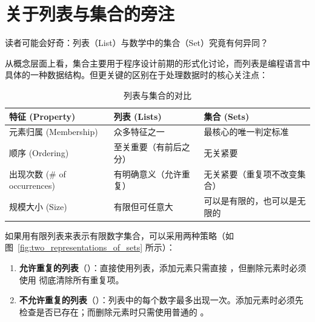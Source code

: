 \section{关于列表与集合的旁注}
\label{sec:ch09_lists_and_sets}

读者可能会好奇：列表（List）与数学中的集合（Set）究竟有何异同？

从概念层面上看，集合主要用于程序设计前期的形式化讨论，而列表是编程语言中具体的一种数据结构。但更关键的区别在于处理数据时的核心关注点：
\begin{table}[htbp]
  \centering
  \caption{列表与集合的对比}
  \label{tab:lists_vs_sets}
  \begin{tabular}{lll}
    \hline
    \textbf{特征 (Property)} & \textbf{列表 (Lists)} & \textbf{集合 (Sets)} \\
    \hline
    元素归属 (Membership) & 众多特征之一 & 最核心的唯一判定标准 \\
    顺序 (Ordering) & 至关重要（有前后之分） & 无关紧要 \\
    出现次数 (\# of occurrences) & 有明确意义（允许重复） & 无关紧要（重复项不改变集合） \\
    规模大小 (Size) & 有限但可任意大 & 可以是有限的，也可以是无限的 \\
    \hline
  \end{tabular}
\end{table}

如果用有限列表来表示有限数字集合，可以采用两种策略（如图~\ref{fig:two_representations_of_sets} 所示）：
\begin{enumerate}
  \item \textbf{允许重复的列表}（）：直接使用列表，添加元素只需直接 ，但删除元素时必须使用  彻底清除所有重复项。
  \item \textbf{不允许重复的列表}（）：列表中的每个数字最多出现一次。添加元素时必须先检查是否已存在；而删除元素时只需使用普通的 。
\end{enumerate}

